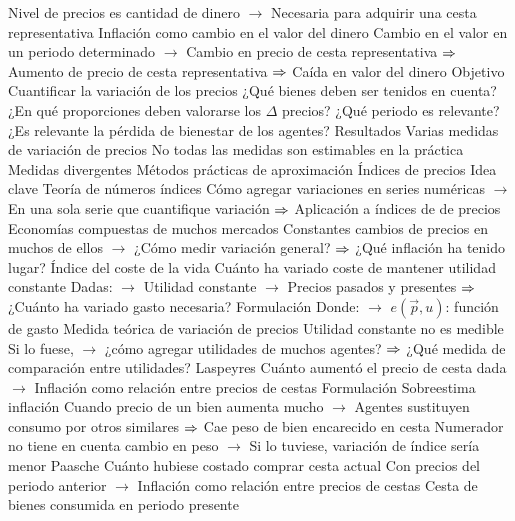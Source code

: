 \documentclass{nuevotema}
\begin{document}
\begin{esquemal}
				\4[] Nivel de precios es cantidad de dinero
				\4[] $\to$ Necesaria para adquirir una cesta representativa
				\4 Inflación como cambio en el valor del dinero
				\4[] Cambio en el valor en un periodo determinado
				\4[] $\to$ Cambio en precio de cesta representativa
				\4[] $\Rightarrow$ Aumento de precio de cesta representativa
				\4[] $\Rightarrow$ Caída en valor del dinero
			\3 Objetivo
				\4 Cuantificar la variación de los precios
				\4 ¿Qué bienes deben ser tenidos en cuenta?
				\4 ¿En qué proporciones deben valorarse los $\Delta$ precios?
				\4 ¿Qué periodo es relevante?
				\4 ¿Es relevante la pérdida de bienestar de los agentes?
			\3 Resultados
				\4 Varias medidas de variación de precios
				\4 No todas las medidas son estimables en la práctica
				\4 Medidas divergentes
				\4 Métodos prácticas de aproximación
		\2 Índices de precios
			\3 Idea clave
				\4 Teoría de números índices
				\4[] Cómo agregar variaciones en series numéricas
				\4[] $\to$ En una sola serie que cuantifique variación
				\4[] $\Rightarrow$ Aplicación a índices de de precios
				\4 Economías compuestas de muchos mercados
				\4[] Constantes cambios de precios en muchos de ellos
				\4[] $\to$ ¿Cómo medir variación general?
				\4[] $\Rightarrow$ ¿Qué inflación ha tenido lugar?
			\3 Índice del coste de la vida
				\4 Cuánto ha variado coste de mantener utilidad constante
				\4[] Dadas:
				\4[] $\to$ Utilidad constante
				\4[] $\to$ Precios pasados y presentes
				\4[] $\Rightarrow$ ¿Cuánto ha variado gasto necesaria?
				\4 Formulación
				\4[] 
				\4[] Donde:
				\4[] $\to$ $e(\vec{p}, u)$: función de gasto
				\4 Medida teórica de variación de precios
				\4[] Utilidad constante no es medible
				\4[] Si lo fuese,
				\4[] $\to$ ¿cómo agregar utilidades de muchos agentes?
				\4[] $\Rightarrow$ ¿Qué medida de comparación entre utilidades?
			\3 Laspeyres
				\4 Cuánto aumentó el precio de cesta dada
				\4[] $\to$ Inflación como relación entre precios de cestas
				\4 Formulación
				\4[] 
				\4 Sobreestima inflación
				\4[] Cuando precio de un bien aumenta mucho
				\4[] $\to$ Agentes sustituyen consumo por otros similares
				\4[] $\Rightarrow$ Cae peso de bien encarecido en cesta
				\4[] Numerador no tiene en cuenta cambio en peso
				\4[] $\to$ Si lo tuviese, variación de índice sería menor
			\3 Paasche
				\4 Cuánto hubiese costado comprar cesta actual
				\4[] Con precios del periodo anterior
				\4[] $\to$ Inflación como relación entre precios de cestas
				\4 Cesta de bienes consumida en periodo presente

\end{esquemal}
\end{document}
